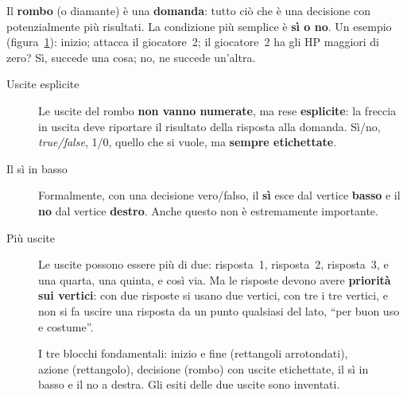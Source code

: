 Il \textbf{rombo} (o diamante) è una \textbf{domanda}: tutto ciò che è una
decisione con potenzialmente più risultati. La condizione più semplice è
\textbf{sì o no}. Un esempio (figura~\ref{fig:fc-decisione}): inizio;
attacca il giocatore~2; il giocatore~2 ha gli HP maggiori di zero? Sì, succede
una cosa; no, ne succede un'altra.

\begin{description}
  \item[Uscite esplicite] Le uscite del rombo \textbf{non vanno numerate}, ma
        rese \textbf{esplicite}: la freccia in uscita deve riportare il
        risultato della risposta alla domanda. Sì/no, \emph{true/false},
        1/0, quello che si vuole, ma \textbf{sempre etichettate}.
  \item[Il sì in basso] Formalmente, con una decisione vero/falso, il
        \textbf{sì} esce dal vertice \textbf{basso} e il \textbf{no} dal
        vertice \textbf{destro}. Anche questo non è estremamente importante.
  \item[Più uscite] Le uscite possono essere più di due: risposta~1,
        risposta~2, risposta~3, e una quarta, una quinta, e così via. Ma le
        risposte devono avere \textbf{priorità sui vertici}: con due risposte
        si usano due vertici, con tre i tre vertici, e non si fa uscire una
        risposta da un punto qualsiasi del lato, ``per buon uso e costume''.
\end{description}

\begin{figure}[htbp]
\centering
{}
\caption{I tre blocchi fondamentali: inizio e fine (rettangoli arrotondati),
azione (rettangolo), decisione (rombo) con uscite etichettate, il sì in basso
e il no a destra. Gli esiti delle due uscite sono inventati.}
\label{fig:fc-decisione}
\end{figure}

